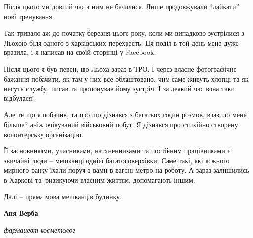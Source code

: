 Після цього ми довгий час з ним не бачилися. Лише продовжували
\enquote{лайкати} нові тренування.

Так тривало аж до початку березня цього року, коли ми випадково зустрілися з
Льохою біля одного з харківських перехресть. Ця подія в той день мене дуже
вразила, і я написав на своїй сторінці у Facebook.


Після цього я був певен, що Льоха зараз в ТРО. І через власне фотографічне
бажання побачити, як там у них все облаштовано, чим саме живуть хлопці та як
несуть службу, писав та пропонував йому зустріч. І за деякий час вона таки
відбулася!

Але те що я побачив, та про що дізнався з багатьох годин розмов, вразило мене
більше? аніж очікуваний військовий побут. Я дізнався про стихійно створену
волонтерську організацію.

Її засновниками, учасниками, натхненниками та постійним працівниками є звичайні
люди – мешканці однієї багатоповерхівки. Саме такі, які кожного мирного ранку
їхали поруч з вами в вагоні метро на роботу. А зараз залишились в Харкові та,
ризикуючи власним життям, допомагають іншим.

Далі – пряма мова мешканців будинку.

\raggedcolumns
\begin{multicols}{2} %
\setlength{\parindent}{0pt}

\textbf{Аня Верба}

\emph{фармацевт-косметолог}

\end{multicols} %
